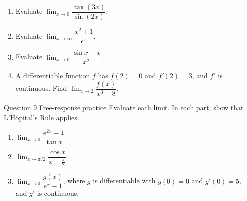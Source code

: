 \documentclass[11pt]{article}
\begin{document}
\begin{enumerate}[leftmargin=*,itemsep=2pt,start=5]
  \item Evaluate $\displaystyle\lim_{x\to 0}\dfrac{\tan(3x)}{\sin(2x)}$.\work{2.8cm}
  \item Evaluate $\displaystyle\lim_{x\to \infty}\dfrac{x^2+1}{e^{x}}$.\work{2.8cm}
  \item Evaluate $\displaystyle\lim_{x\to 0}\dfrac{\sin x-x}{x^2}$.\work{2.8cm}
  \item A differentiable function $f$ has $f(2)=0$ and $f'(2)=3$, and $f'$ is continuous. Find $\displaystyle\lim_{x\to 2}\dfrac{f(x)}{x^3-8}$.\work{2.8cm}
\end{enumerate}

\begin{frbox}{Question 9 \textperiodcentered{} Free-response practice}
Evaluate each limit. In each part, show that L'H\^opital's Rule applies.
\begin{enumerate}[label=(\alph*),leftmargin=*,itemsep=2pt]
  \item $\displaystyle\lim_{x\to 0}\dfrac{e^{2x}-1}{\tan x}$\work{2.6cm}
  \item $\displaystyle\lim_{x\to \pi/2}\dfrac{\cos x}{x-\frac{\pi}{2}}$\work{2.6cm}
  \item $\displaystyle\lim_{x\to 0}\dfrac{g(x)}{e^{x}-1}$, where $g$ is differentiable with $g(0)=0$ and $g'(0)=5$, and $g'$ is continuous.\work{2.6cm}
\end{enumerate}
\end{frbox}
\end{document}
